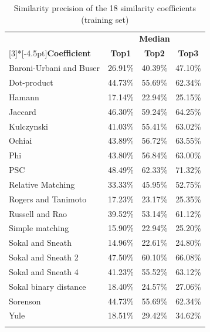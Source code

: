 \documentclass[smallextended,natbib]{svjour3}
\begin{document}
{\setlength{\tabcolsep}{15pt}
\begin{table}[tbp]
  \centering
  \caption{Similarity precision of the 18 similarity coefficients (training set)}
\vspace{-8pt}
\footnotesize
    \begin{tabular}{lccc}
    \hline
    \rowcolor{gray!50}\multicolumn{4}{c}{\textbf{MOVE CLASS}} \\
    \hline
    \rowcolor{gray!25} & \multicolumn{3}{c}{\textbf{Median}} \\
     \rowcolor{gray!25} \multirow{-2}[3]{*}[-4.5pt]{\textbf{Coefficient}} & \multicolumn{1}{c}{\textbf{Top1}} & \multicolumn{1}{c}{\textbf{Top2}} & \textbf{Top3} \\
    Baroni-Urbani and Buser & 26.91\% & 40.39\% & 47.10\% \\[-0.0110cm]
    \rowcolor{gray!15}Dot-product & 44.73\% & 55.69\% & 62.34\% \\[-0.0110cm]
    Hamann & 17.14\% & 22.94\% & 25.15\% \\[-0.0110cm]
    \rowcolor{gray!15}Jaccard & 46.30\% & 59.24\% & 64.25\% \\[-0.0110cm]
    Kulczynski & 41.03\% & 55.41\% & 63.02\% \\[-0.0110cm]
    \rowcolor{gray!15}Ochiai & 43.89\% & 56.72\% & 63.55\% \\[-0.0110cm]
    Phi & 43.80\% & 56.84\% & 63.00\% \\[-0.0110cm]
    \rowcolor{mycolor}PSC & 48.49\% & 62.33\% & 71.32\% \\[-0.0110cm]
    Relative Matching & 33.33\% & 45.95\% & 52.75\% \\[-0.0110cm]
    \rowcolor{gray!15}Rogers and Tanimoto & 17.23\% & 23.17\% & 25.35\% \\[-0.0110cm]
    Russell and Rao & 39.52\% & 53.14\% & 61.12\% \\[-0.0110cm]
    \rowcolor{gray!15}Simple matching & 15.90\% & 22.94\% & 25.20\% \\[-0.0110cm]
    Sokal and Sneath & 14.96\% & 22.61\% & 24.80\% \\[-0.0110cm]
    \rowcolor{gray!15}Sokal and Sneath 2 & 47.50\% & 60.10\% & 66.08\% \\[-0.0110cm]
    Sokal and Sneath 4 & 41.23\% & 55.52\% & 63.12\% \\[-0.0110cm]
    \rowcolor{gray!15}Sokal binary distance & 18.40\% & 24.57\% & 27.06\% \\[-0.0110cm]
    Sorenson & 44.73\% & 55.69\% & 62.34\% \\[-0.0110cm]
    \rowcolor{gray!15}Yule & 18.51\% & 29.42\% & 34.62\% \\[-0.0110cm]
     \multicolumn{4}{c}{} \\    \hline


\end{tabular}
\end{table}}
\end{document}
